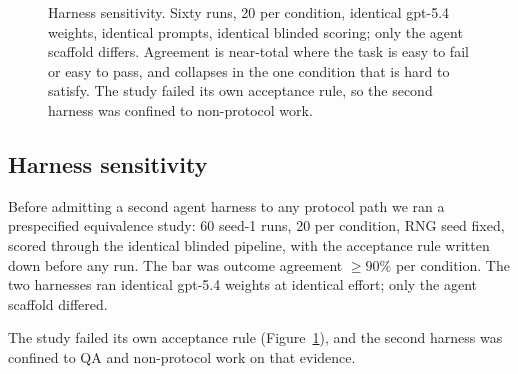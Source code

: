 \documentclass[11pt]{article}
\begin{document}
\begin{figure}[tb]
\centering
{}
\caption{Harness sensitivity. Sixty runs, 20 per condition, identical gpt-5.4
weights, identical prompts, identical blinded scoring; only the agent scaffold
differs. Agreement is near-total where the task is easy to fail or easy to pass,
and collapses in the one condition that is hard to satisfy. The study failed its
own acceptance rule, so the second harness was confined to non-protocol work.}
\label{fig:harness}
\end{figure}

\subsection{Harness sensitivity}

Before admitting a second agent harness to any protocol path we ran a
prespecified equivalence study: 60 seed-1 runs, 20 per condition, RNG seed fixed,
scored through the identical blinded pipeline, with the acceptance rule written
down before any run. The bar was outcome agreement $\geq 90\%$ per condition. The
two harnesses ran identical gpt-5.4 weights at identical effort; only the agent
scaffold differed.

The study failed its own acceptance rule (Figure~\ref{fig:harness}), and the
second harness was confined to QA and non-protocol work on that evidence.
\end{document}
